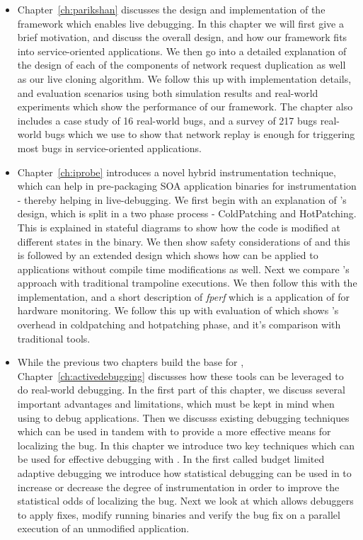\begin{itemize}
	\item Chapter~\ref{ch:parikshan} discusses the design and implementation of the \parikshan framework which enables live debugging.
	In this chapter we will first give a brief motivation, and discuss the overall design, and how our framework fits into service-oriented applications.
	We then go into a detailed explanation of the design of each of the components of network request duplication as well as our live cloning algorithm.
	We follow this up with implementation details, and evaluation scenarios using both simulation results and real-world experiments which show the performance of our framework. 
	The chapter also includes a case study of 16 real-world bugs, and a survey of 217 bugs real-world bugs which we use to show that network replay is enough for triggering most bugs in service-oriented applications.
	
	
	\item Chapter~\ref{ch:iprobe} introduces \iprobe a novel hybrid instrumentation technique, which can help in pre-packaging SOA application binaries for instrumentation - thereby helping in live-debugging.
	We first begin with an explanation of \iprobe's design, which is split in a two phase process - ColdPatching and HotPatching. This is explained in stateful diagrams to show how the code is modified at different states in the binary.
	We then show safety considerations of \iprobe and this is followed by an extended design which shows how \iprobe can be applied to applications without compile time modifications as well. 
	Next we compare \iprobe's approach with traditional trampoline executions. We then follow this with the implementation, and a short description of \textit{fperf} which is a application of \iprobe for hardware monitoring. 
	We follow this up with evaluation of \iprobe which shows \iprobe's overhead in coldpatching and hotpatching phase, and it's comparison with traditional tools.
	
	
	\item While the previous two chapters build the base for \livedebugging, Chapter~\ref{ch:activedebugging} discusses how these tools can be leveraged to do real-world debugging. In the first part of this chapter, we discuss several important advantages and limitations, which must be kept in mind when using \parikshan to debug applications. 
	Then we discusss existing debugging techniques which can be used in tandem with \livedebugging to provide a more effective means for localizing the bug.
	In this chapter we introduce two key techniques which can be used for effective debugging with \parikshan. In the first called budget limited adaptive debugging we introduce how statistical debugging can be used in \parikshan to increase or decrease the degree of instrumentation in order to improve the statistical odds of localizing the bug.
	Next we look at \activedebugging which allows debuggers to apply fixes, modify running binaries and verify the bug fix on a parallel execution of an unmodified application.
	

\end{itemize}
